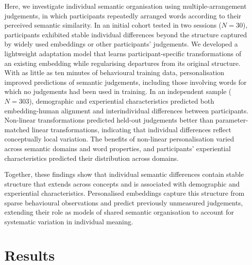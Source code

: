 \documentclass[pdflatex,sn-mathphys]{sn-jnl}
\begin{document}
Here, we investigate individual semantic organisation using multiple-arrangement judgements, in which participants repeatedly arranged words according to their perceived semantic similarity. In an initial cohort tested in two sessions ($N = 30$), participants exhibited stable individual differences beyond the structure captured by widely used embeddings or other participants' judgements. We developed a lightweight adaptation model that learns participant-specific transformations of an existing embedding while regularising departures from its original structure. With as little as ten minutes of behavioural training data, personalisation improved predictions of semantic judgements, including those involving words for which no judgements had been used in training. In an independent sample ($N = 303$), demographic and experiential characteristics predicted both embedding-human alignment and interindividual differences between participants. Non-linear transformations predicted held-out judgements better than parameter-matched linear transformations, indicating that individual differences reflect conceptually local variation. The benefits of non-linear personalisation varied across semantic domains and word properties, and participants' experiential characteristics predicted their distribution across domains. 

Together, these findings show that individual semantic differences contain stable structure that extends across concepts and is associated with demographic and experiential characteristics. Personalised embeddings capture this structure from sparse behavioural observations and predict previously unmeasured judgements, extending their role as models of shared semantic organisation to account for systematic variation in individual meaning.

\section{Results}\label{results}
\end{document}
